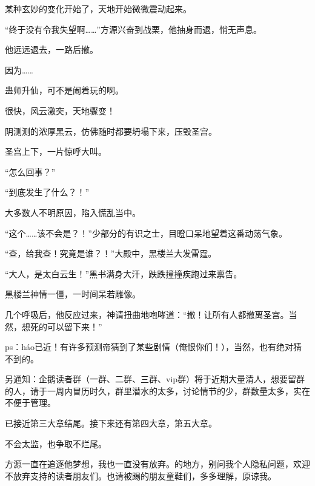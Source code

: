 \begin{this_body}
某种玄妙的变化开始了，天地开始微微震动起来。

“终于没有令我失望啊……”方源兴奋到战栗，他抽身而退，悄无声息。

他远远退去，一路后撤。

因为……

蛊师升仙，可不是闹着玩的啊。

很快，风云激突，天地骤变！

阴测测的浓厚黑云，仿佛随时都要坍塌下来，压毁圣宫。

圣宫上下，一片惊呼大叫。

“怎么回事？”

“到底发生了什么？！”

大多数人不明原因，陷入慌乱当中。

“这个……该不会是？！”少部分的有识之士，目瞪口呆地望着这番动荡气象。

“查，给我查！究竟是谁？！”大殿中，黑楼兰大发雷霆。

“大人，是太白云生！”黑书满身大汗，跌跌撞撞疾跑过来禀告。

黑楼兰神情一僵，一时间呆若雕像。

几个呼吸后，他反应过来，神请扭曲地咆哮道：“撤！让所有人都撤离圣宫。当然，想死的可以留下来！”

ps：háo已近！有许多预测帝猜到了某些剧情（俺恨你们！），当然，也有绝对猜不到的。

另通知：企鹅读者群（一群、二群、三群、vip群）将于近期大量清人，想要留群的人，请于一周内冒历时久，群里潜水的太多，讨论情节的少，群数量太多，实在不便于管理。

已接近第三大章结尾。接下来还有第四大章，第五大章。

不会太监，也争取不烂尾。

方源一直在追逐他梦想，我也一直没有放弃。的地方，别问我个人隐私问题，欢迎不放弃支持的读者朋友们。也请被踢的朋友童鞋们，多多理解，原谅我。

\end{this_body}

